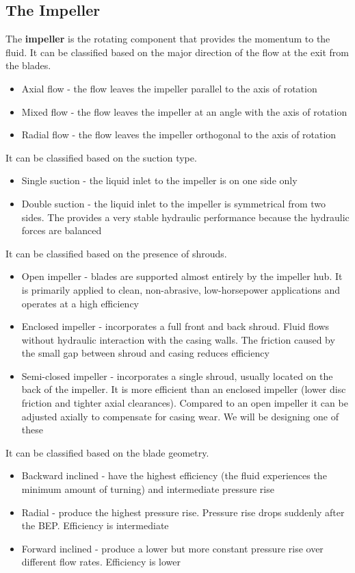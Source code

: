 \documentclass[class=report, crop=false, 12pt,a4paper]{standalone}
\begin{document}
\subsection{The Impeller}
The \textbf{impeller} is the rotating component that provides the momentum to the fluid. It can be classified based on the major direction of the flow at the exit from the blades.
\begin{itemize}
  \item Axial flow - the flow leaves the impeller parallel to the axis of rotation
  \item Mixed flow - the flow leaves the impeller at an angle with the axis of rotation
  \item Radial flow - the flow leaves the impeller orthogonal to the axis of rotation
\end{itemize}
It can be classified based on the suction type.
\begin{itemize}
  \item Single suction - the liquid inlet to the impeller is on one side only
  \item Double suction - the liquid inlet to the impeller is symmetrical from two sides. The provides a very stable hydraulic performance because the hydraulic forces are balanced
\end{itemize}
It can be classified based on the presence of shrouds.
\begin{itemize}
  \item Open impeller - blades are supported almost entirely by the impeller hub. It is primarily applied to clean, non-abrasive, low-horsepower applications and operates at a high efficiency
  \item Enclosed impeller - incorporates a full front and back shroud. Fluid flows without hydraulic interaction with the casing walls. The friction caused by the small gap between shroud and casing reduces efficiency
  \item Semi-closed impeller - incorporates a single shroud, usually located on the back of the impeller. It is more efficient than an enclosed impeller (lower disc friction and tighter axial clearances). Compared to an open impeller it can be adjusted axially to compensate for casing wear. We will be designing one of these
\end{itemize}
It can be classified based on the blade geometry.
\begin{itemize}
  \item Backward inclined - have the highest efficiency (the fluid experiences the minimum amount of turning) and intermediate pressure rise
  \item Radial - produce the highest pressure rise. Pressure rise drops suddenly after the BEP. Efficiency is intermediate
  \item Forward inclined - produce a lower but more constant pressure rise over different flow rates. Efficiency is lower
\end{itemize}
\end{document}
